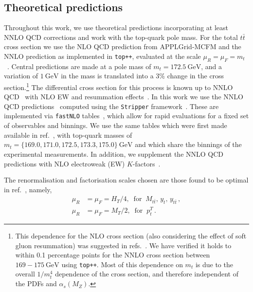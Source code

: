 \documentclass[sn-mathphys]{sn-jnl}%
\newcommand{\pT}{p^T_t}
\newcommand{\mtt}{M_{t\bar{t}}}
\newcommand{\yt}{y_{t}}
\newcommand{\ytt}{y_{t\bar{t}}}
\newcommand{\mt}{m_t}
\newcommand{\as}{\alpha_s(M_Z)}
\newcommand{\gev}{\mathrm{GeV}}
\begin{document}
\subsection{Theoretical predictions} \label{theory}
Throughout this work, we use theoretical predictions incorporating at least NNLO QCD corrections and work with the top-quark pole mass. For the total $t\bar{t}$ cross section we use the NLO QCD prediction from APPLGrid-MCFM and the NNLO prediction as implemented in \texttt{top++}, evaluated at the scale \mbox{$\mu_R=\mu_F=\mt$} ~\cite{Czakon:2011xx,Barnreuther:2012wtj,Czakon:2012zr,Czakon:2012pz,Czakon:2013goa}. Central predictions are made at a pole mass of $\mt = 172.5~\mathrm{GeV}$, and a variation of $1~\mathrm{GeV}$ in the mass is translated into a 3\% change in the cross section.\footnote{This dependence for the NLO cross section (also considering the effect of soft gluon resummation) was suggested in refs.~\cite{Catani:1996dj,Cacciari:2011hy}. We have verified it holds to within 0.1 percentage points for the NNLO cross section between $169-175~\gev$ using \texttt{top++}. Most of this dependence on $\mt$ is due to the overall $1/m_t^4$ dependence of the cross section, and therefore independent of the PDFs and $\as$.} The differential cross section for this process is known up to NNLO QCD~\cite{Catani:2019iny,Catani:2019hip} with NLO EW and resummation effects~\cite{Czakon:2017wor,Czakon:2019txp}. In this work we use the NNLO QCD predictions~\cite{Czakon:2015owf,Czakon:2016ckf,Czakon:2016dgf} computed using the \texttt{Stripper} framework~\cite{Czakon:2010td,Czakon:2014oma}. These are implemented via \texttt{fastNLO} tables~\cite{Kluge:2006xs,Britzger:2012bs,Czakon:2017dip}, which allow for rapid evaluations for a fixed set of observables and binnings. We use the same tables which were first made available in ref.~\cite{Cooper-Sarkar:2020twv}, with top-quark masses of \mbox{$\mt=\{169.0,171.0,172.5,173.3,175.0\}~\gev$} and which share the binnings of the experimental measurements. In addition, we supplement the NNLO QCD predictions with NLO electroweak (EW) $K$-factors~\cite{Czakon:2019txp}.

The renormalisation and factorisation scales chosen are those found to be optimal in ref.~\cite{Czakon:2016dgf}, namely,
%
\begin{align}
\mu_R&=\mu_F=H_T/4, \;\; \text{for} \;\; \mtt,\, \yt, \, \ytt \,, \\
\mu_R&=\mu_F=M_T/2, \;\; \text{for} \;\; \pT \,.
\end{align}
%
\end{document}
